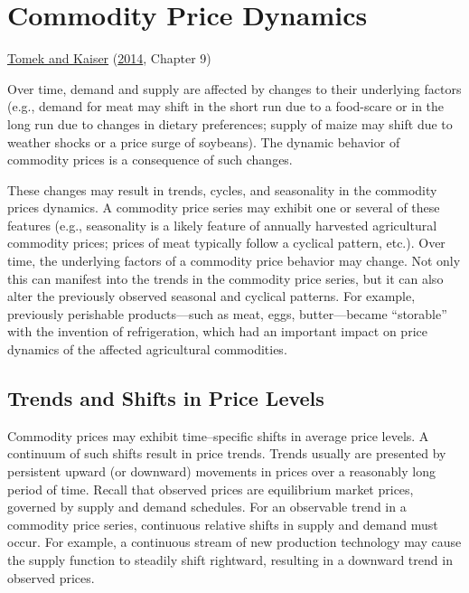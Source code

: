 \documentclass[
  oneside]{book}
\begin{document}
\hypertarget{commodity-price-dynamics}{%
\chapter{Commodity Price Dynamics}\label{commodity-price-dynamics}}

\protect\hyperlink{ref-tomek2014}{Tomek and Kaiser} (\protect\hyperlink{ref-tomek2014}{2014}, Chapter 9)

Over time, demand and supply are affected by changes to their underlying factors (e.g., demand for meat may shift in the short run due to a food-scare or in the long run due to changes in dietary preferences; supply of maize may shift due to weather shocks or a price surge of soybeans). The dynamic behavior of commodity prices is a consequence of such changes.

These changes may result in trends, cycles, and seasonality in the commodity prices dynamics. A commodity price series may exhibit one or several of these features (e.g., seasonality is a likely feature of annually harvested agricultural commodity prices; prices of meat typically follow a cyclical pattern, etc.). Over time, the underlying factors of a commodity price behavior may change. Not only this can manifest into the trends in the commodity price series, but it can also alter the previously observed seasonal and cyclical patterns. For example, previously perishable products---such as meat, eggs, butter---became ``storable'' with the invention of refrigeration, which had an important impact on price dynamics of the affected agricultural commodities.

\hypertarget{trends-and-shifts-in-price-levels}{%
\section{Trends and Shifts in Price Levels}\label{trends-and-shifts-in-price-levels}}

Commodity prices may exhibit time--specific shifts in average price levels. A continuum of such shifts result in price trends. Trends usually are presented by persistent upward (or downward) movements in prices over a reasonably long period of time. Recall that observed prices are equilibrium market prices, governed by supply and demand schedules. For an observable trend in a commodity price series, continuous relative shifts in supply and demand must occur. For example, a continuous stream of new production technology may cause the supply function to steadily shift rightward, resulting in a downward trend in observed prices.
\end{document}

